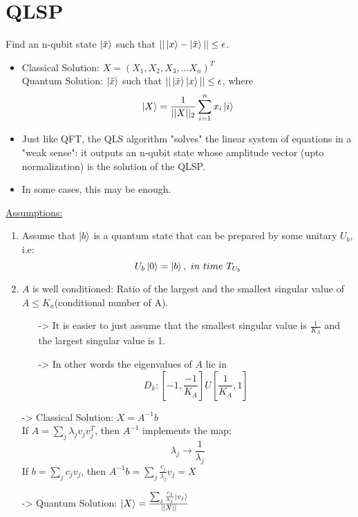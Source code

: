\documentclass[11.5pt, paper=a4]{article}
\theoremstyle{definition}
\numberwithin{theorem}{section}
\begin{document}
\section{QLSP}
Find an n-qubit state $\ket{\Tilde{x}}$ such that $||\ket{x} - \ket{\Tilde{x}} || \le \epsilon$.
\begin{itemize}
    \item Classical Solution: $X=(X_{1}, X_{2}, X_{3},... X_{n})^{T}$\\
    Quantum Solution: $\ket{\Tilde{x}}$ such that $|| \ket{\Tilde{x}} \ket{x} || \le \epsilon$, where
    $$ \ket{X} = \frac{1}{||X||_{2}}\sum_{i=1}^{n}x_{i}\ket{i} $$
    \item Just like QFT, the QLS algorithm "solves" the linear system of equations in a "weak sense": it outputs an n-qubit state whose amplitude vector (upto normalization) is the solution of the QLSP.
    \item In some cases, this may be enough.
\end{itemize}
\underline{Assumptions:} 
\begin{enumerate}
    \item Assume that $\ket{b}$ is a quantum state that can be prepared by some unitary $U_{b}$, i.e:
    $$ U_{b}\ket{0} = \ket{b},\ in\ time\ T_{U_{b}} $$
    \item $A$ is well conditioned: Ratio of the largest and the smallest singular value of $A \le K_{a}$(conditional number of A).
    \begin{itemize}
        \item[->] It is easier to just assume that the smallest singular value is $\frac{1}{K_{A}}$ and the largest singular value is 1.
        \item[->] In other words the eigenvalues of $A$ lie in
        $$ D_{k}: \left[-1,\frac{-1}{K_{A}}\right]U\left[\frac{1}{K_{A}},1\right] $$
    \end{itemize}
\end{enumerate}
\begin{itemize}
    \item[->] Classical Solution: $X=A^{-1}b$\\
    If $A=\sum_{j}\lambda_{j}v_{j}v_{j}^{T}$, then $A^{-1}$ implements the map:
    $$ \lambda_{j} \rightarrow \frac{1}{\lambda_{j}} $$
    If $b=\sum_{j}c_{j}v_{j}$, then $A^{-1}b=\sum_{j}\frac{c_{j}}{\lambda_{j}}v_{j} = X$
    \item[->] Quantum Solution: $\ket{X} = \frac{\sum_{j}\frac{c_{j}}{\lambda_{j}}\ket{v_{j}}}{||X||}$
\end{itemize}
\end{document}
